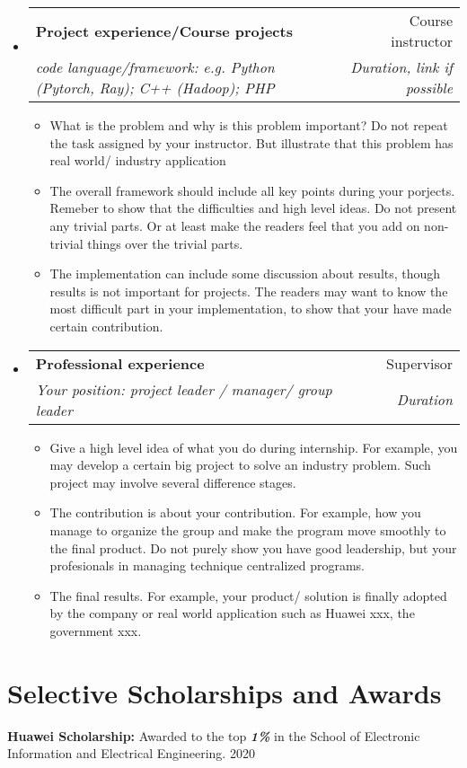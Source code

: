 \documentclass[letterpaper,12pt]{article}
\makeatletter
\newcommand{\resumeItem}[1]{
  \item\small{
    {#1 \vspace{-2pt}}
  }
}
\newcommand{\resumeSubheading}[4]{
  \vspace{-1pt}\item
    \begin{tabular*}{0.97\textwidth}[t]{l@{\extracolsep{\fill}}r}
      \textbf{#1} & #2 \\
      \textit{\small#3} & \textit{\small #4} \\
    \end{tabular*}\vspace{-8pt}
}
\newcommand{\resumeSubHeadingListStart}{\begin{itemize}[leftmargin=0.15in, label={}]}
\newcommand{\resumeSubHeadingListEnd}{\end{itemize}}
\newcommand{\resumeItemListStart}{\begin{itemize}}
\newcommand{\resumeItemListEnd}{\end{itemize}\vspace{-5pt}}
\makeatother
\begin{document}
\resumeSubHeadingListStart
\resumeSubheading
{Project experience/Course projects}
{Course instructor}%
{code language/framework: e.g. Python (Pytorch, Ray); C++ (Hadoop); PHP
}{Duration, link if possible}
\resumeItemListStart
\resumeItem{What is the problem and why is this problem important? Do not repeat the task assigned by your instructor. But illustrate that this problem has real world/ industry application}
\resumeItem{The overall framework should include all key points during your porjects. Remeber to show that the difficulties and high level ideas. Do not present any trivial parts. Or at least make the readers feel that you add on non-trivial things over the trivial parts.}
\resumeItem{The implementation can include some discussion about results, though results is not important for projects. The readers may want to know the most difficult part in your implementation, to show that your have made certain contribution.}
\resumeItemListEnd
\vspace{-5pt}
\resumeSubHeadingListEnd

\resumeSubHeadingListStart
\resumeSubheading
{Professional experience}
{Supervisor}%
{Your position: project leader / manager/ group leader}{Duration}
\resumeItemListStart
\resumeItem{Give a high level idea of what you do during internship. For example, you may develop a certain big project to solve an industry problem. Such project may involve several difference stages.}
\resumeItem{The contribution is about your contribution. For example, how you manage to organize the group and make the program move smoothly to the final product. Do not purely show you have good leadership, but your profesionals in managing technique centralized programs.}
\resumeItem{The final results. For example, your product/ solution is finally adopted by the company or real world application such as Huawei xxx, the government xxx.}
\resumeItemListEnd
\vspace{-5pt}
\resumeSubHeadingListEnd
 
 \vspace{-5pt}
 \section{\color{DarkBlue}Selective Scholarships and Awards}
 \begin{itemize}[leftmargin=0.15in]
 	\small{\item{
 			\textbf{Huawei Scholarship:} {Awarded to the top \textbf{\textit{\color{StrongBlue}1\%}} in the School of Electronic Information and Electrical Engineering. 2020} }}\vspace{-5pt}
 \end{itemize}
\end{document}
